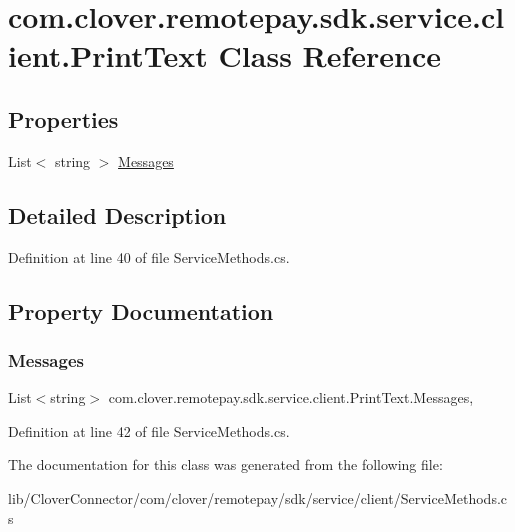 \hypertarget{classcom_1_1clover_1_1remotepay_1_1sdk_1_1service_1_1client_1_1_print_text}{}\section{com.\+clover.\+remotepay.\+sdk.\+service.\+client.\+Print\+Text Class Reference}
\label{classcom_1_1clover_1_1remotepay_1_1sdk_1_1service_1_1client_1_1_print_text}
\subsection*{Properties}
\begin{DoxyCompactItemize}
\item 
List$<$ string $>$ \hyperlink{classcom_1_1clover_1_1remotepay_1_1sdk_1_1service_1_1client_1_1_print_text_a3eb1b8ad2a7b56671c2ac71e43dceb63}{Messages}
\end{DoxyCompactItemize}


\subsection{Detailed Description}


Definition at line 40 of file Service\+Methods.\+cs.



\subsection{Property Documentation}
\mbox{\label{classcom_1_1clover_1_1remotepay_1_1sdk_1_1service_1_1client_1_1_print_text_a3eb1b8ad2a7b56671c2ac71e43dceb63}} 
\subsubsection{\texorpdfstring{Messages}{Messages}}
{\footnotesize\ttfamily List$<$string$>$ com.\+clover.\+remotepay.\+sdk.\+service.\+client.\+Print\+Text.\+Messages\hspace{0.3cm}{\ttfamily [get]}, {\ttfamily [set]}}



Definition at line 42 of file Service\+Methods.\+cs.



The documentation for this class was generated from the following file\+:\begin{DoxyCompactItemize}
\item 
lib/\+Clover\+Connector/com/clover/remotepay/sdk/service/client/Service\+Methods.\+cs\end{DoxyCompactItemize}
